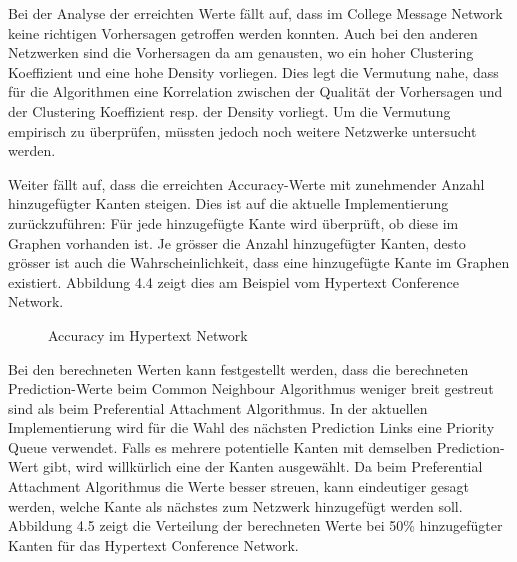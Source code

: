 Bei der Analyse der erreichten Werte fällt auf, dass im College Message Network keine richtigen Vorhersagen getroffen werden konnten.
Auch bei den anderen Netzwerken sind die Vorhersagen da am genausten, wo ein hoher Clustering Koeffizient und eine hohe Density vorliegen.
Dies legt die Vermutung nahe, dass für die Algorithmen eine Korrelation zwischen der Qualität der Vorhersagen und der Clustering Koeffizient resp. der Density vorliegt.
Um die Vermutung empirisch zu überprüfen, müssten jedoch noch weitere Netzwerke untersucht werden.

Weiter fällt auf, dass die erreichten Accuracy-Werte mit zunehmender Anzahl hinzugefügter Kanten steigen.
Dies ist auf die aktuelle Implementierung zurückzuführen: Für jede hinzugefügte Kante wird überprüft, ob diese im Graphen vorhanden ist.
Je grösser die Anzahl hinzugefügter Kanten, desto grösser ist auch die Wahrscheinlichkeit, dass eine hinzugefügte Kante im Graphen existiert.
Abbildung 4.4 zeigt dies am Beispiel vom Hypertext Conference Network. %

\vspace{5mm}
\begin{figure}[h]
\centering
{}
\label{fig:hypertext}
\caption{Accuracy im Hypertext Network}
\end{figure}

\newpage
Bei den berechneten Werten kann festgestellt werden, dass die berechneten Prediction-Werte beim Common Neighbour Algorithmus weniger breit gestreut sind als beim Preferential Attachment Algorithmus.
In der aktuellen Implementierung wird für die Wahl des nächsten Prediction Links eine Priority Queue verwendet. Falls es mehrere potentielle Kanten mit demselben Prediction-Wert gibt, wird willkürlich eine der Kanten ausgewählt.
Da beim Preferential Attachment Algorithmus die Werte besser streuen, kann eindeutiger gesagt werden, welche Kante als nächstes zum Netzwerk hinzugefügt werden soll.
Abbildung 4.5 %
zeigt die Verteilung der berechneten Werte bei 50\% hinzugefügter Kanten für das Hypertext Conference Network.

